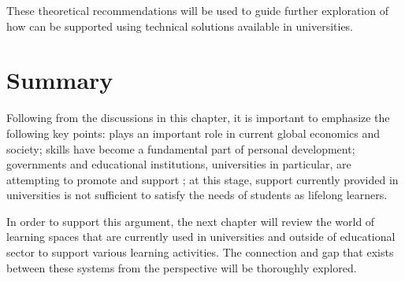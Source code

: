 These theoretical recommendations will be used to guide further exploration of
 how \LLLs can be supported using technical solutions available in universities.

\section{Summary} 

Following from the discussions in this chapter, it is important to emphasize
the following key points: \LLLs plays an important role in current global
economics and society; \LLLs skills have become a fundamental part of personal
development; governments and educational institutions, universities in
particular, are attempting to promote and support \LLLsn; at this stage, \LLLs
support currently provided in universities is not sufficient to satisfy the
needs of students as lifelong learners.

In order to support this argument, the next chapter will review the world of
learning spaces that are currently used in universities and outside of
educational sector to support various learning activities. The connection and
gap that exists between these systems from the \LLLs perspective will be
thoroughly explored.

